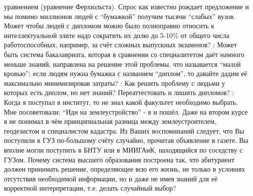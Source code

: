 \begin{drama}
{} уравнением (уравнение Ферхюльста). Спрос как известно рождает предложение и мы помимо миллионов людей с “бумажкой” получим тысячи “слабых” вузов. Может чтобы людей с дипломом можно было полноправно относить к интеллектуальной элите надо сократить их долю до 5-10\% от общего числа работоспособных, например, за счёт сложных выпускных экзаменов?
	\maxspeaks: Может быть система бакалавриата, которая в сравнении со специалитетом даёт намного меньше знаний, направлена на решение этой проблемы, что называется “малой кровью”: если людям нужна бумажка с названием “диплом”, то давайте дадим её максимально минимизировав затраты? 
	\maxspeaks: Как решить проблему с людьми у которых есть диплом, но нет знаний? Переаттестовать и лишить дипломов? 
\maxspeaks: Когда я поступал в институт, то не знал какой факультет необходимо выбрать. Мне посоветовали: “Иди на землеустройство” - я и пошёл. Даже на втором курсе я не понимал в чём принципиальная разница между землеустроителем, геодезистом и специалистом кадастра. 
	Из Ваших воспоминаний следует, что Вы поступили в ГУЗ по-большому счёту случайно, прочитав объявление в газете. Вы вполне могли поступить в БНТУ или в МИИГАиК, находящийся по соседству с ГУЗом. Почему система высшего образования построена так, что абитуриент должен принимать решение, определяющее всю его жизнь, не только в условиях отсутствия необходимой информации, но и даже не имея знаний для её корректной интерпретации, т.е. делать случайный выбор?


\end{drama}
